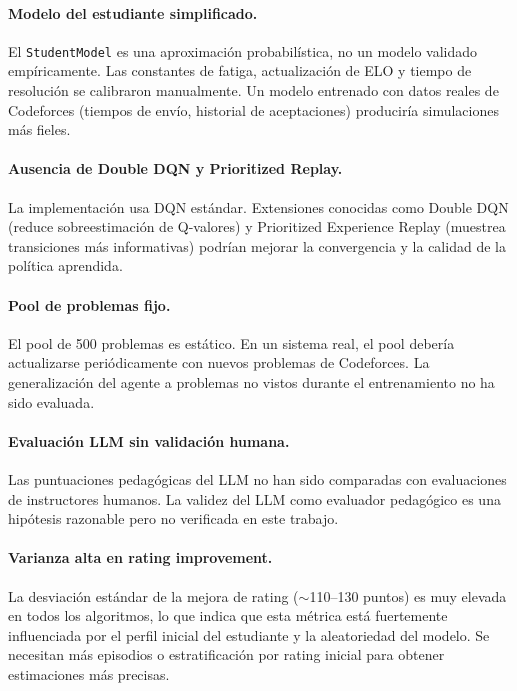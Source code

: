 \documentclass[12pt, a4paper]{article}
\begin{document}
\paragraph{Modelo del estudiante simplificado.}
El \texttt{StudentModel} es una aproximación probabilística, no un modelo
validado empíricamente. Las constantes de fatiga, actualización de ELO y
tiempo de resolución se calibraron manualmente. Un modelo entrenado con datos
reales de Codeforces (tiempos de envío, historial de aceptaciones) produciría
simulaciones más fieles.

\paragraph{Ausencia de Double DQN y Prioritized Replay.}
La implementación usa DQN estándar. Extensiones conocidas como Double DQN
(reduce sobreestimación de Q-valores) y Prioritized Experience Replay
(muestrea transiciones más informativas) podrían mejorar la convergencia
y la calidad de la política aprendida.

\paragraph{Pool de problemas fijo.}
El pool de 500 problemas es estático. En un sistema real, el pool debería
actualizarse periódicamente con nuevos problemas de Codeforces. La
generalización del agente a problemas no vistos durante el entrenamiento
no ha sido evaluada.

\paragraph{Evaluación LLM sin validación humana.}
Las puntuaciones pedagógicas del LLM no han sido comparadas con evaluaciones
de instructores humanos. La validez del LLM como evaluador pedagógico es
una hipótesis razonable pero no verificada en este trabajo.

\paragraph{Varianza alta en rating improvement.}
La desviación estándar de la mejora de rating ($\sim$110--130 puntos) es
muy elevada en todos los algoritmos, lo que indica que esta métrica está
fuertemente influenciada por el perfil inicial del estudiante y la
aleatoriedad del modelo. Se necesitan más episodios o estratificación por
rating inicial para obtener estimaciones más precisas.
\end{document}
